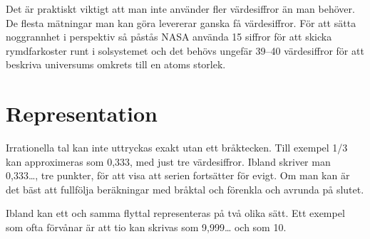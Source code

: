 Det är praktiskt viktigt att man inte använder fler värdesiffror än
man behöver.  De flesta mätningar man kan göra levererar ganska få
värdesiffror.  För att sätta noggrannhet i perspektiv så påstås NASA
använda 15 siffror för att skicka rymdfarkoster runt i solsystemet och
det behövs ungefär 39--40 värdesiffror för att beskriva universums
omkrets till en atoms storlek.

\section{Representation}

Irrationella tal kan inte uttryckas exakt utan ett bråktecken. Till
exempel 1/3 kan approximeras som 0,333, med just tre värdesiffror.
Ibland skriver man 0,333…, tre punkter, för att visa att serien
fortsätter för evigt. Om man kan är det bäst att fullfölja beräkningar
med bråktal och förenkla och avrunda på slutet.

Ibland kan ett och samma flyttal representeras på två olika sätt. Ett
exempel som ofta förvånar är att tio kan skrivas som 9,999… och som
10.







